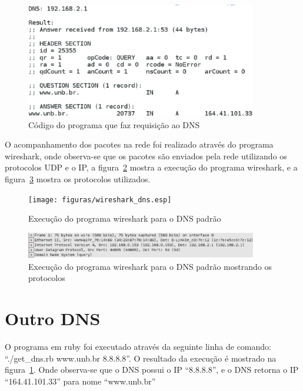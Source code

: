 \begin{figure}[h]
  \centering
  \includegraphics[width=0.9\textwidth]{figuras/ruby_default_dns.eps}
  \caption{Código do programa que faz requisição ao DNS}
  \label{fig:ruby_default_dns}
\end{figure}

O acompanhamento dos pacotes na rede foi realizado através do programa
wireshark, onde observa-se que os pacotes são enviados pela rede utilizando
os protocolos UDP e o IP, a figura~\ref{fig:wireshark_dns} mostra a
execução do programa wireshark, e a figura~\ref{fig:wireshark_dns_protocol} mostra
os protocolos utilizados.

\begin{figure}[h]
  \centering
  \texttt{[image: figuras/wireshark\_dns.esp]}
  \caption{Execução do programa wireshark para o DNS padrão}
  \label{fig:wireshark_dns}
\end{figure}

\begin{figure}[h]
  \centering
  \includegraphics[width=0.9\textwidth]{figuras/wireshark_dns_protocol.eps}
  \caption{Execução do programa wireshark para o DNS padrão mostrando os protocolos}
  \label{fig:wireshark_dns_protocol}
\end{figure}


\section{Outro DNS}

O programa em ruby foi executado através da seguinte linha de comando:
“./get{\_}dns.rb www.unb.br 8.8.8.8”. O resultado da execução é mostrado na
figura~\ref{fig:ruby_default_dns}. Onde observa-se que o DNS possui
o IP “8.8.8.8”, e o DNS retorna o IP “164.41.101.33” para nome “www.unb.br”

